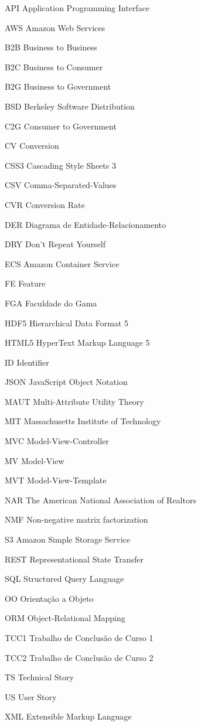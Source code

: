 \begin{siglas}
  \item[API] Application Programming Interface
  \item[AWS] Amazon Web Services
  \item[B2B] Business to Business
  \item[B2C] Business to Consumer
  \item[B2G] Business to Government
  \item[BSD] Berkeley Software Distribution
  \item[C2G] Consumer to Government
  \item[CV] Conversion
  \item[CSS3] Cascading Style Sheets 3
  \item[CSV] Comma-Separated-Values
  \item[CVR] Conversion Rate
  \item[DER] Diagrama de Entidade-Relacionamento
  \item[DRY] Don’t Repeat Yourself
  \item[ECS] Amazon Container Service
  \item[FE] Feature
  \item[FGA] Faculdade do Gama
  \item[HDF5] Hierarchical Data Format 5
  \item[HTML5] HyperText Markup Language 5
  \item[ID] Identifier
  \item[JSON] JavaScript Object Notation
  \item[MAUT] Multi-Attribute Utility Theory
  \item[MIT] Massachusetts Institute of Technology
  \item[MVC] Model-View-Controller
  \item[MV] Model-View
  \item[MVT] Model-View-Template
  \item[NAR] The American National Association of Realtors
  \item[NMF] Non-negative matrix factorization
  \item[S3] Amazon Simple Storage Service
  \item[REST] Representational State Transfer
  \item[SQL] Structured Query Language
  \item[OO] Orientação a Objeto
  \item[ORM] Object-Relational Mapping
  \item[TCC1] Trabalho de Conclusão de Curso 1
  \item[TCC2] Trabalho de Conclusão de Curso 2
  \item[TS] Technical Story
  \item[US] User Story
  \item[XML] Extensible Markup Language
\end{siglas}
